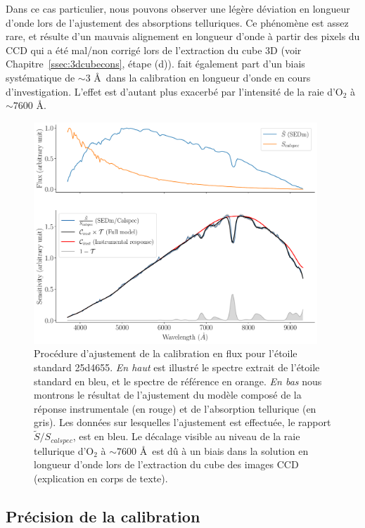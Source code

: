 \documentclass[../main/main.tex]{subfiles}
\begin{document}
Dans ce cas particulier, nous pouvons
observer une légère déviation en longueur d'onde lors de l'ajustement
des absorptions telluriques. Ce phénomène est assez rare, et résulte
d'un mauvais alignement en longueur d'onde
à partir des pixels du CCD qui a été mal/non
corrigé lors de l'extraction du cube 3D (voir
Chapitre~\ref{ssec:3dcubecons}, étape (d)). \citet{pysedm} fait
également part d'un biais systématique de $\sim3$ \AA\ dans la
calibration en longueur d'onde en cours d'investigation. L'effet est d'autant plus
exacerbé par l'intensité de la raie d'O$_{2}$ à $\sim7600$ \AA.

\begin{figure}[ht]
  \centering
  \includegraphics[width=0.95\textwidth]{../figures/06_irf/calibmodel.pdf}
  \caption[Procédure d'ajustement de la calibration en flux]{Procédure
    d'ajustement de la calibration en flux pour l'étoile standard
    25d4655. \emph{En haut} est illustré le spectre extrait de l'étoile
    standard en bleu, et le spectre de référence en orange. \emph{En
      bas} nous montrons le résultat de l'ajustement du modèle composé
    de la réponse instrumentale (en rouge) et de l'absorption tellurique
  (en gris). Les données sur lesquelles l'ajustement est effectuée, le
  rapport $\tilde{S}/S_{calspec}$, est en bleu. Le décalage
  visible au niveau de la raie tellurique d'O$_{2}$ à $\sim7600$ \AA\ est
dû à un biais dans la solution en longueur d'onde lors de l'extraction
du cube des images CCD (explication en corps de texte).}
  \label{fig:calibmodel}
\end{figure}

\subsection{Précision de la calibration}\label{ssec:resultscalib}
\end{document}
